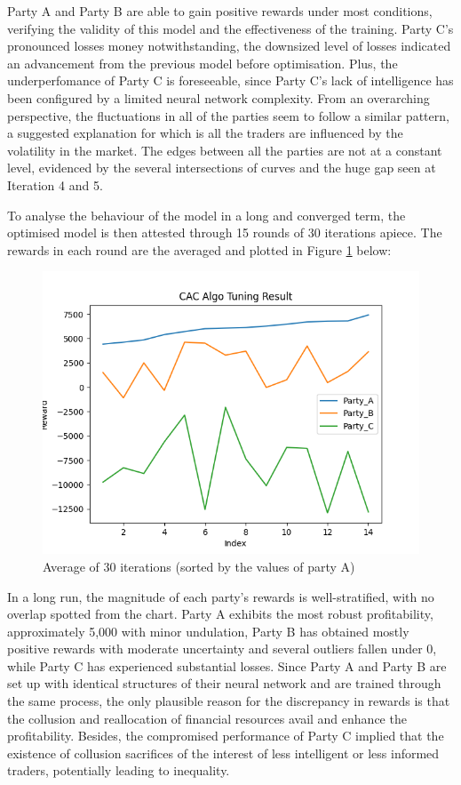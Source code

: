 \documentclass[11pt,twoside]{article}
\numberwithin{Theorem}{section}
\numberwithin{Definition}{section}
\numberwithin{Lemma}{section}
\numberwithin{Algorithm}{section}
\numberwithin{equation}{section}
\begin{document}
Party A and Party B are able to gain positive rewards under most conditions, verifying the validity of this model and the effectiveness of the training. Party C's pronounced losses money notwithstanding, the downsized level of losses indicated an advancement from the previous model before optimisation. Plus, the underperfomance of Party C is foreseeable, since Party C's lack of intelligence has been configured by a limited neural network complexity. From an overarching perspective, the fluctuations in all of the parties seem to follow a similar pattern, a suggested explanation for which is all the traders are influenced by the volatility in the market. The edges between all the parties are not at a constant level, evidenced by the several intersections of curves and the huge gap seen at Iteration 4 and 5.


To analyse the behaviour of the model in a long and converged term, the optimised model is then attested through 15 rounds of 30 iterations apiece. The rewards in each round are the averaged and plotted in Figure \ref{fig:ave} below:
\begin{figure}[!ht]
    \centering
    \includegraphics[scale=0.7]{images/Average.png}
    \caption{Average of 30 iterations (sorted by the values of party A)}
    \label{fig:ave}
\end{figure}

In a long run, the magnitude of each party's rewards is well-stratified, with no overlap spotted from the chart. Party A exhibits the most robust profitability, approximately 5,000 with minor undulation, Party B has obtained mostly positive rewards with moderate uncertainty and several outliers fallen under 0, while Party C has experienced substantial losses. Since Party A and Party B are set up with identical structures of their neural network and are trained through the same process, the only plausible reason for the discrepancy in rewards is that the collusion and reallocation of financial resources avail and enhance the profitability. Besides, the compromised performance of Party C implied that the existence of collusion sacrifices of the interest of less intelligent or less informed traders, potentially leading to inequality.
\end{document}
